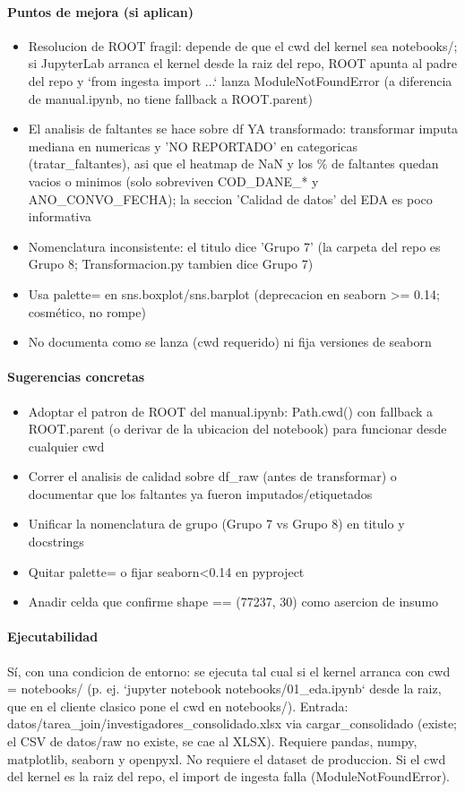 \paragraph{Puntos de mejora (si aplican)}
\begin{itemize}
  \item Resolucion de ROOT fragil: depende de que el cwd del kernel sea notebooks/; si JupyterLab arranca el kernel desde la raiz del repo, ROOT apunta al padre del repo y `from ingesta import ...` lanza ModuleNotFoundError (a diferencia de manual.ipynb, no tiene fallback a ROOT.parent)
  \item El analisis de faltantes se hace sobre df YA transformado: transformar imputa mediana en numericas y 'NO REPORTADO' en categoricas (tratar\_faltantes), asi que el heatmap de NaN y los \% de faltantes quedan vacios o minimos (solo sobreviven COD\_DANE\_* y ANO\_CONVO\_FECHA); la seccion 'Calidad de datos' del EDA es poco informativa
  \item Nomenclatura inconsistente: el titulo dice 'Grupo 7' (la carpeta del repo es Grupo 8; Transformacion.py tambien dice Grupo 7)
  \item Usa palette= en sns.boxplot/sns.barplot (deprecacion en seaborn >= 0.14; cosmético, no rompe)
  \item No documenta como se lanza (cwd requerido) ni fija versiones de seaborn
\end{itemize}

\paragraph{Sugerencias concretas}
\begin{itemize}
  \item Adoptar el patron de ROOT del manual.ipynb: Path.cwd() con fallback a ROOT.parent (o derivar de la ubicacion del notebook) para funcionar desde cualquier cwd
  \item Correr el analisis de calidad sobre df\_raw (antes de transformar) o documentar que los faltantes ya fueron imputados/etiquetados
  \item Unificar la nomenclatura de grupo (Grupo 7 vs Grupo 8) en titulo y docstrings
  \item Quitar palette= o fijar seaborn<0.14 en pyproject
  \item Anadir celda que confirme shape == (77237, 30) como asercion de insumo
\end{itemize}

\paragraph{Ejecutabilidad}
Sí, con una condicion de entorno: se ejecuta tal cual si el kernel arranca con cwd = notebooks/ (p. ej. `jupyter notebook notebooks/01\_eda.ipynb` desde la raiz, que en el cliente clasico pone el cwd en notebooks/). Entrada: datos/tarea\_join/investigadores\_consolidado.xlsx via cargar\_consolidado (existe; el CSV de datos/raw no existe, se cae al XLSX). Requiere pandas, numpy, matplotlib, seaborn y openpyxl. No requiere el dataset de produccion. Si el cwd del kernel es la raiz del repo, el import de ingesta falla (ModuleNotFoundError).


